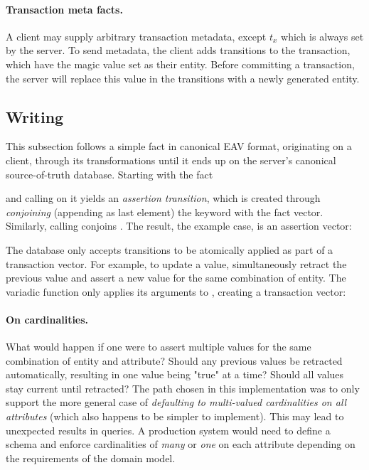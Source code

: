 \paragraph{Transaction meta facts.}
A client may supply arbitrary transaction metadata, except $t_x$ which is always set by the server. To send metadata, the client adds transitions to the transaction, which have the magic value  set as their entity. Before committing a transaction, the server will replace this value in the transitions with a newly generated entity.

\cleardoublepage
\subsection{Writing}

This subsection follows a simple fact in canonical EAV format, originating on a client, through its transformations until it ends up on the server's canonical source-of-truth database. Starting with the fact

\begin{center}
\end{center}

and calling  on it yields an \emph{assertion transition}, which is created through \emph{conjoining} (appending as last element) the \lisp{:+} keyword with the fact vector. Similarly, calling  conjoins \lisp{:-}. The result, the example case, is an assertion vector:

\begin{center}
\end{center}

The database only accepts transitions to be atomically applied as part of a transaction vector. For example, to update a value, simultaneously retract the previous value and assert a new value for the same combination of entity. The variadic  function only applies its arguments to , creating a transaction vector:

\begin{center}
\end{center}

\paragraph{On cardinalities.} What would happen if one were to assert multiple values for the same combination of entity and attribute? Should any previous values be retracted automatically, resulting in one value being "true" at a time? Should all values stay current until retracted? The path chosen in this implementation was to only support the more general case of \emph{defaulting to multi-valued cardinalities on all attributes} (which also happens to be simpler to implement). This may lead to unexpected results in queries. A production system would need to define a schema and enforce cardinalities of \emph{many} or \emph{one} on each attribute depending on the requirements of the domain model.

